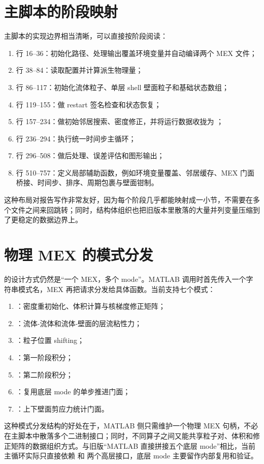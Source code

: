 \section{主脚本的阶段映射}
主脚本的实现边界相当清晰，可以直接按阶段阅读：
\begin{enumerate}[leftmargin=2.5em]
    \item 行 16--36：初始化路径、处理输出覆盖环境变量并自动编译两个 MEX 文件；
    \item 行 38--84：读取配置并计算派生物理量；
    \item 行 86--117：初始化流体粒子、单层 shell 壁面粒子和基础状态数组；
    \item 行 119--155：做 restart 签名检查和状态恢复；
    \item 行 157--234：做初始邻居搜索、密度修正，并将运行数据收拢为 ；
    \item 行 236--294：执行统一时间步主循环；
    \item 行 296--508：做后处理、误差评估和图形输出；
    \item 行 510--757：定义局部辅助函数，例如环境变量覆盖、邻居缓存、MEX 门面桥接、时间步、排序、周期包裹与壁面钳制。
\end{enumerate}
这种布局对报告写作非常友好，因为每个阶段几乎都能映射成一小节，不需要在多个文件之间来回跳转；同时，结构体组织也把旧版本里散落的大量并列变量压缩到了更稳定的数据边界上。

\section{物理 MEX 的模式分发}
 的设计方式仍然是“一个 MEX，多个 mode”。MATLAB 调用时首先传入一个字符串模式名，MEX 再把请求分发给具体函数。当前支持七个模式：
\begin{enumerate}[leftmargin=2.5em]
    \item {}：密度重初始化、体积计算与核梯度修正矩阵；
    \item {}：流体-流体和流体-壁面的层流粘性力；
    \item {}：粒子位置 shifting；
    \item {}：第一阶段积分；
    \item {}：第二阶段积分；
    \item {}：复用底层 mode 的单步推进门面；
    \item {}：上下壁面剪应力统计门面。
\end{enumerate}
这种模式分发结构的好处在于，MATLAB 侧只需维护一个物理 MEX 句柄，不必在主脚本中散落多个二进制接口；同时，不同算子之间又能共享粒子对、体积和修正矩阵的数据组织方式。与旧版“MATLAB 直接拼接五个底层 mode”相比，当前主循环实际只直接依赖  和  两个高层接口，底层 mode 主要留作内部复用和验证。

